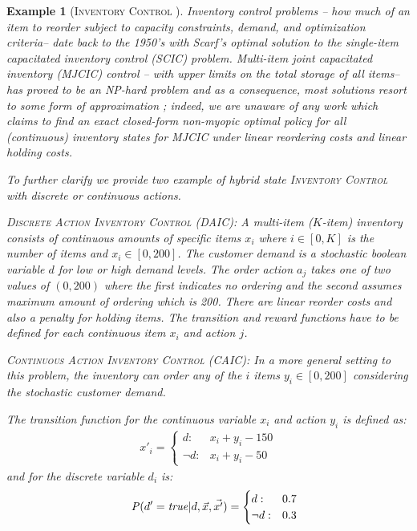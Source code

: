 \documentclass[twoside,11pt]{article}
\newcommand{\InventoryControl}{\textsc{Inventory Control }}
\newtheorem*{example*}{Example}
\begin{document}
\begin{example*} [\InventoryControl]
Inventory control problems -- how much of an
item to reorder subject to capacity constraints, demand, and optimization criteria-- date back to the 1950's with Scarf's optimal solution to the \emph{single-item capacitated inventory control} (SCIC) problem.
\emph{Multi-item joint capacitated inventory (MJCIC) control} -- with upper limits
on the total storage of all items-- has proved to be an NP-hard problem and
as a consequence, most solutions resort to some form of
approximation \cite{bitran,wusd10}; indeed, we are unaware of any 
work which claims to find an exact closed-form non-myopic
optimal policy for \emph{all} (continuous) inventory states for MJCIC 
under linear reordering costs and linear holding costs.

To further clarify we provide two example of hybrid state \InventoryControl with discrete or continuous actions.
\vspace{2mm}

\textsc{Discrete Action} \InventoryControl (\textsc{DAIC}): 
A multi-item ($K$-item) inventory consists of continuous amounts of specific items $x_i$ where $i \in [0,K]$ is the number of items and $x_i \in [0,200]$. The customer demand is a stochastic boolean variable $d$ for low or high demand levels.  The order action $a_j$ takes one of two values of $(0,200)$ where the first indicates no ordering and the second assumes maximum amount of ordering which is 200. There are linear reorder costs and also a penalty for holding items. The transition and reward functions have to be defined for each continuous item $x_i$ and action $j$.

\vspace{2mm}
\textsc{Continuous Action}  \InventoryControl (\textsc{CAIC}):
In a more general setting to this problem, the inventory can order  any of the $i$ items $y_i \in [0,200]$ considering the stochastic customer demand. 

The transition function for the continuous variable $x_i$ and action $y_i$ is defined as: 
{%
\vspace{-2mm}
\begin{align}
x'_i= \begin{cases}
d  : & x_i + y_i - 150 \\
\neg d : & x_i + y_i - 50    
\end{cases} 
\end{align}
and for the discrete variable $d_i$ is:
\begin{align}
\hspace{4mm}
 \mathit{P}(d'=\mathit{true}|d,\vec{x},\vec{x'})=  \begin{cases}
d     :& 0.7\\
\neg d : & 0.3	\\
\end{cases} \label{eq:trans_inv}
\end{align}
\vspace{-2mm}}


\end{example*}
\end{document}
